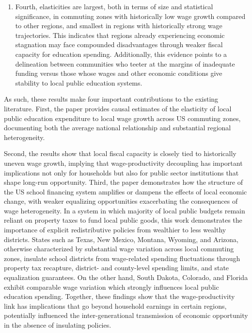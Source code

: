 \documentclass[
  10pt,
]{article}
\begin{document}
\begin{enumerate}
  presence of a clean fiscal transmission channel from wages to public
  education expenditure, unobstructed by redistributive policies,
  defines the statistically significant results in majority of the
  states that exhibit strong within-state wage-spending relationships.
  More precisely, comparing states with similarly high relative levels
  of wage variation across commuting zones, the wage-spending
  relationship breaks down in the states that employ either property tax
  recapture and redistribution mechanisms or school district spending
  caps as tools to achieve greater spending equity.
\item
  Fourth, elasticities are largest, both in terms of size and
  statistical significance, in commuting zones with historically low
  wage growth compared to other regions, and smallest in regions with
  historically strong wage trajectories. This indicates that regions
  already experiencing economic stagnation may face compounded
  disadvantages through weaker fiscal capacity for education spending.
  Additionally, this evidence points to a delineation between
  communities who teeter at the margins of inadequate funding versus
  those whose wages and other economic conditions give stability to
  local public education systems.
\end{enumerate}

As such, these results make four important contributions to the existing
literature. First, the paper provides causal estimates of the elasticity
of local public education expenditure to local wage growth across US
commuting zones, documenting both the average national relationship and
substantial regional heterogeneity.

Second, the results show that local fiscal capacity is closely tied to
historically uneven wage growth, implying that wage-productivity
decoupling has important implications not only for households but also
for public sector institutions that shape long-run opportunity. Third,
the paper demonstrates how the structure of the US school financing
system amplifies or dampens the effects of local economic change, with
weaker equalizing opportunities exacerbating the consequences of wage
heterogeneity. In a system in which majority of local public budgets
remain reliant on property taxes to fund local public goods, this work
demonstrates the importance of explicit redistributive policies from
wealthier to less wealthy districts. States such as Texas, New Mexico,
Montana, Wyoming, and Arizona, otherwise characterized by substantial
wage variation across local commuting zones, insulate school districts
from wage-related spending fluctuations through property tax recapture,
district- and county-level spending limits, and state equalization
guarantees. On the other hand, South Dakota, Colorado, and Florida
exhibit comparable wage variation which strongly influences local public
education spending. Together, these findings show that the
wage-productivity link has implications that go beyond household
earnings in certain regions, potentially influenced the
inter-generational transmission of economic opportunity in the absence
of insulating policies.
\end{document}
